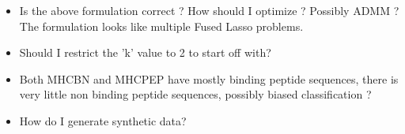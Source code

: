 \documentclass{article}
\begin{document}
\begin{itemize}
{    }
    
    \item{Is the above formulation correct ? How should I optimize ? Possibly ADMM ? The formulation looks like multiple Fused Lasso problems.}
    \item{ Should I restrict the 'k' value to 2 to start off with?}
    \item{Both MHCBN and MHCPEP have mostly binding peptide sequences, there is very little non binding peptide sequences, possibly biased classification ?}
    \item{How do I generate synthetic data?}
\end{itemize}
\end{document}
